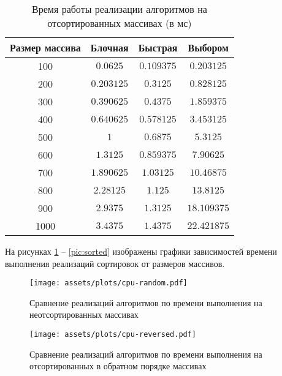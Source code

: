\begin{table}[h]
	\begin{center}
		\begin{threeparttable}
			\captionsetup{justification=raggedright,singlelinecheck=off}
			\caption{Время работы реализации алгоритмов на отсортированных массивах (в мс)}
			\label{tbl:time_measurements_rand}
			\begin{tabular}{|c|c|c|c|}
				\hline
				Размер массива & Блочная & Быстрая & Выбором \\
				\hline
				100 &$ 0.0625 $&$ 0.109375 $&$ 0.203125 $\\
				\hline
				200 &$ 0.203125 $&$ 0.3125 $&$ 0.828125 $\\
				\hline
				300 &$ 0.390625 $&$ 0.4375 $&$ 1.859375 $\\
				\hline
				400 &$ 0.640625 $&$ 0.578125 $&$ 3.453125 $\\
				\hline
				500 &$ 1 $&$ 0.6875 $&$ 5.3125 $\\
				\hline
				600 &$ 1.3125 $&$ 0.859375 $&$ 7.90625 $\\
				\hline
				700 &$ 1.890625 $&$ 1.03125 $&$ 10.46875 $\\
				\hline
				800 &$ 2.28125 $&$ 1.125 $&$ 13.8125 $\\
				\hline
				900 &$ 2.9375 $&$ 1.3125 $&$ 18.109375 $\\
				\hline
				1000 &$ 3.4375 $&$ 1.4375 $&$ 22.421875 $\\
				\hline
			\end{tabular}
		\end{threeparttable}
	\end{center}
\end{table}

\clearpage
На рисунках \ref{pic:random} -- \ref{pic:sorted} изображены графики зависимостей времени выполнения реализаций сортировок от размеров массивов.

\begin{figure}[H]
	\centering
	\texttt{[image: assets/plots/cpu-random.pdf]}
	\caption{Сравнение реализаций алгоритмов по времени выполнения на неотсортированных массивах}
	\label{pic:random}
\end{figure}

\newpage

\begin{figure}[H]
	\centering
	\texttt{[image: assets/plots/cpu-reversed.pdf]}
	\caption{Сравнение реализаций алгоритмов по времени выполнения на отсортированных в обратном порядке массивах}
	\label{pic:reversed}
\end{figure}

